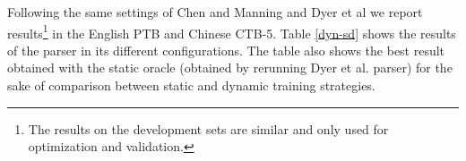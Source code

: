 \documentclass[11pt]{article}
\begin{document}
Following the same settings of Chen and Manning  and Dyer et al  we report results\footnote{The results on the development sets are similar and only used for optimization and validation.} in the English PTB
and Chinese CTB-5. %
Table \ref{dyn-sd} shows the results of the parser in its different configurations. The
table also shows the best result obtained with the static oracle (obtained by rerunning Dyer et al. parser) for the sake of comparison between static and dynamic training strategies.
\end{document}

